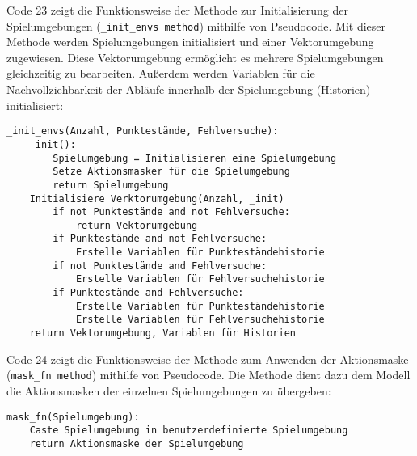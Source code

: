 \begin{minipage}{\linewidth}
Code 23 zeigt die Funktionsweise der Methode zur Initialisierung der Spielumgebungen (\texttt{\_init\_envs method}) mithilfe von Pseudocode. Mit dieser Methode werden Spielumgebungen initialisiert und einer Vektorumgebung zugewiesen. Diese Vektorumgebung ermöglicht es mehrere Spielumgebungen gleichzeitig zu bearbeiten. Außerdem werden Variablen für die Nachvollziehbarkeit der Abläufe innerhalb der Spielumgebung (Historien) initialisiert:
\vspace{0.5cm}
\begin{lstlisting}[caption={Methode zur Initialisierung der Spielumgebungen}]
_init_envs(Anzahl, Punktestände, Fehlversuche):
	_init():
		Spielumgebung = Initialisieren eine Spielumgebung
		Setze Aktionsmasker für die Spielumgebung
		return Spielumgebung
	Initialisiere Verktorumgebung(Anzahl, _init)
		if not Punktestände and not Fehlversuche:
			return Vektorumgebung
		if Punktestände and not Fehlversuche:
			Erstelle Variablen für Punkteständehistorie
		if not Punktestände and Fehlversuche:
			Erstelle Variablen für Fehlversuchehistorie
		if Punktestände and Fehlversuche:
			Erstelle Variablen für Punkteständehistorie
			Erstelle Variablen für Fehlversuchehistorie
	return Vektorumgebung, Variablen für Historien
\end{lstlisting}
\end{minipage}

\begin{minipage}{\linewidth}
Code 24 zeigt die Funktionsweise der Methode zum Anwenden der Aktionsmaske (\texttt{mask\_fn method}) mithilfe von Pseudocode. Die Methode dient dazu dem Modell die Aktionsmasken der einzelnen Spielumgebungen zu übergeben:
\vspace{0.5cm}
\begin{lstlisting}[caption={Methode zum Anwenden der Aktionsmaske}]
mask_fn(Spielumgebung):
	Caste Spielumgebung in benutzerdefinierte Spielumgebung
	return Aktionsmaske der Spielumgebung
\end{lstlisting}
\end{minipage}

